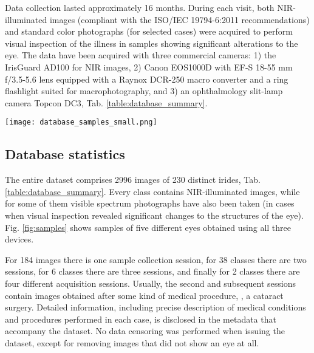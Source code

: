\documentclass[10pt,twocolumn,letterpaper]{article}
\begin{document}
Data collection lasted approximately 16 months. During each visit, both NIR-illuminated images (compliant with the ISO/IEC 19794-6:2011 recommendations) and standard color photographs (for selected cases) were acquired to perform visual inspection of the illness in samples showing significant alterations to the eye. The data have been acquired with three commercial cameras: 1) the IrisGuard AD100 for NIR images, 2) Canon EOS1000D with EF-S 18-55 mm f/3.5-5.6 lens equipped with a Raynox DCR-250 macro converter and a ring flashlight suited for macrophotography, and 3) an ophthalmology slit-lamp camera Topcon DC3, Tab. \ref{table:database_summary}.

\begin{figure*}[!t]
\centering
\texttt{[image: database\_samples\_small.png]}
\caption{Samples of 5 different eyes acquired using three different imaging systems: IrisGuard AD-100 (top row), Canon EOS 1000D (middle row), and Topcon DC3 slit-lamp camera (bottom row). Each column includes samples corresponding to a different group used further in our experimental study, namely: healthy eye (H1-H3), non-healthy eye but with a clear pattern (C1-C3), an eye with geometrical deviations (G1-G3), an eye with iris tissue impairments (T1-T3), and an eye with obstructions in front of the iris (O1-O3).}
\label{fig:samples}
\end{figure*}

\subsection{Database statistics}

The entire dataset comprises 2996 images of 230 distinct irides, Tab. \ref{table:database_summary}. Every class contains NIR-illuminated images, while for some of them visible spectrum photographs have also been taken (in cases when visual inspection revealed significant changes to the structures of the eye). Fig. \ref{fig:samples} shows samples of five different eyes obtained using all three devices. 

For 184 images there is one sample collection session, for 38 classes there are two sessions, for 6 classes there are three sessions, and finally for 2 classes there are four different acquisition sessions. Usually, the second and subsequent sessions contain images obtained after some kind of medical procedure, \eg, a cataract surgery. Detailed information, including precise description of medical conditions and procedures performed in each case, is disclosed in the metadata that accompany the dataset. No data censoring was performed when issuing the dataset, except for removing images that did not show an eye at all.
\end{document}

